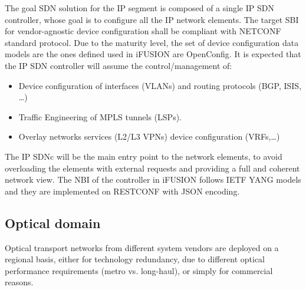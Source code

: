 \documentclass[10pt, conference]{IEEEtran}
\begin{document}
The goal SDN solution for the IP segment is composed of a single IP SDN controller, whose goal is to configure all the IP network elements. The target SBI for vendor-agnostic device configuration shall be compliant with NETCONF standard protocol. Due to the maturity level, the set of device configuration data models are the ones defined used in i\uppercase{FUSION} are OpenConfig. 
It is expected that the IP SDN controller will assume the control/management of:
\begin{itemize}
\item Device configuration of interfaces (VLANs) and routing protocols (BGP, ISIS, …)
\item Traffic Engineering of MPLS tunnels (LSPs). 
\item Overlay networks services (L2/L3 VPNs) device configuration (VRFs,\dots)
\end{itemize}

The IP SDNc will be the main entry point to the network elements, to avoid overloading the elements with external requests and providing a  full and coherent network view. The NBI of the controller in i\uppercase{FUSION} follows IETF YANG models and they are implemented on RESTCONF with JSON encoding.


\subsection{Optical domain}
\label{section:dwdm}
Optical transport networks from different system vendors are deployed on a regional basis, either for technology redundancy, due to different optical performance requirements (metro vs. long-haul), or simply for commercial reasons. 
\end{document}
